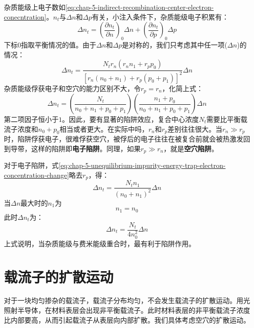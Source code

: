 杂质能级上电子数如\autoref{eq:chap-5-indirect-recombination-center-electron-conecntration}。$n_t$与$\Delta n$和$\Delta p$有关，小注入条件下，杂质能级电子积累有：
\begin{equation}
    \Delta n_t=\left(\frac{\partial n_t}{\partial n}\right)_0\Delta n+\left(\frac{\partial n_t}{\partial p}\right)_0\Delta p
\end{equation}
下标$0$指取平衡情况的值。由于$\Delta n$和$\Delta p$是对称的，我们只考虑其中任一项($\Delta n$)的情况：
\begin{equation}
    \Delta n_t=\frac{N_tr_n\left(r_nn_1+r_pp_0\right)}{\left[r_n(n_0+n_1)+r_p(p_0+p_1)\right]^2}\Delta n\label{eq:chap-5-unequilibrium-impurity-energy-trap-electron-concentration-change}
\end{equation}
杂质能级俘获电子和空穴的能力区别不大，令$r_p=r_n$，化简上式：
\begin{equation}
    \Delta n_t=\left(\frac{N_t}{n_0+n_1+p_0+p_1}\right)\left(\frac{n_1+p_0}{n_0+n_1+p_0+p_1}\right)\Delta n
\end{equation}
第二项因子恒小于$1$。因此，要有显著的陷阱效应，复合中心浓度$N_t$需要比平衡载流子浓度和$n_0+p_0$相当或者更大。在实际中吗，$r_n$和$r_p$差别往往很大。当$r_n\gg r_p$时，陷阱俘获电子，很难俘获空穴，被俘后的电子往往在被复合前就会被热激发回到导带，这样的陷阱即\textbf{电子陷阱}。同理，如果$r_p\gg r_n$，就是\textbf{空穴陷阱}。

对于电子陷阱，式\autoref{eq:chap-5-unequilibrium-impurity-energy-trap-electron-concentration-change}略去$r_p$，得：
\begin{equation}
    \Delta n_t=\frac{N_tn_1}{\left(n_0+n_1\right)^2}\Delta n
\end{equation}
当$\Delta n$最大时的$n_1$为
\begin{equation}
    n_1=n_0
\end{equation}
此时$\Delta n_t$为：
\begin{equation}
    \Delta n_t=\frac{N_t}{4n_0^2}\Delta n
\end{equation}
上式说明，当杂质能级与费米能级重合时，最有利于陷阱作用。

\section{载流子的扩散运动}

对于一块均匀掺杂的载流子，载流子分布均匀，不会发生载流子的扩散运动。用光照射半导体，在材料表层会出现非平衡载流子。此时材料表层的非平衡载流子浓度比内部要高，从而引起载流子从表层向内部扩散。我们具体考虑空穴的扩散运动。


